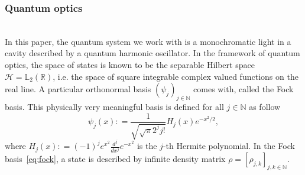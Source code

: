 \documentclass[a4paper]{amsart}
\newcommand{\deq}{\mathrel{\mathop:} = } %
\newcommand{\N}{\mathbb{N}}
\begin{document}
\subsubsection{Quantum optics}
\label{Quantum opticcs}
\noindent\\

In this paper, the quantum system we work with is a monochromatic light in a
cavity described by a quantum harmonic oscillator. In the framework of quantum
optics,  the space of states is known to be the separable Hilbert space
$\mathcal{H}=\mathbb{L}_2(\mathbb{R})$, i.e. the space of square integrable
complex valued functions on the real line. A particular orthonormal basis
$\left(\psi_j\right)_{j\in\mathbb{N}}$ comes with, called the Fock basis. This
physically very meaningful basis is defined for all $j\in\mathbb{N}$ as follow
          \begin{equation}
          \label{eq:fock}
          \psi_j(x)\deq \frac{1}{\sqrt{\sqrt{\pi}2^jj!}}H_j(x)e^{-x^2/2},
          \end{equation}
where $H_j(x) \deq (-1)^j e^{x^2} \frac{d^j}{dx^j} e^{-x^2}$ is the $j$-th
Hermite polynomial. In the Fock basis~\eqref{eq:fock}, a state is described  by
infinite density matrix $\rho=[\rho_{j,k}]_{j,k\in\N}$. \\
\end{document}

